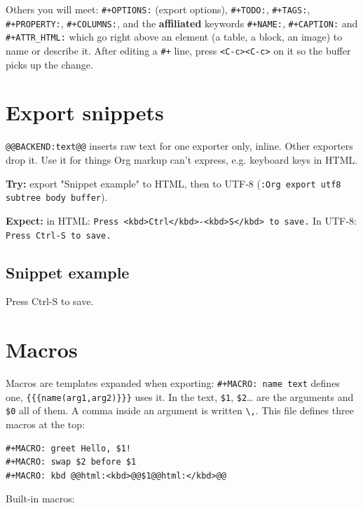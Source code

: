 Others you will meet: \texttt{\#+OPTIONS:} (export options), \texttt{\#+TODO:},
\texttt{\#+TAGS:}, \texttt{\#+PROPERTY:}, \texttt{\#+COLUMNS:}, and the \textbf{affiliated} keywords
\texttt{\#+NAME:}, \texttt{\#+CAPTION:} and \texttt{\#+ATTR\_HTML:} which go right above an element
(a table, a block, an image) to name or describe it. After editing a \texttt{\#+}
line, press \texttt{<C-c><C-c>} on it so the buffer picks up the change.
\section{Export snippets}
\label{sec:orgde2857d}
\texttt{@@BACKEND:text@@} inserts raw text for one exporter only, inline. Other
exporters drop it. Use it for things Org markup can't express, e.g.
keyboard keys in HTML.

\textbf{Try:} export "Snippet example" to HTML, then to UTF-8
(\texttt{:Org export utf8 subtree body buffer}).

\textbf{Expect:} in HTML: \texttt{Press <kbd>Ctrl</kbd>-<kbd>S</kbd> to save.} In UTF-8:
\texttt{Press Ctrl-S to save.}
\subsection{Snippet example}
\label{sec:org8242909}
Press Ctrl-S to save.
\section{Macros}
\label{sec:orgb72b707}
Macros are templates expanded when exporting: \texttt{\#+MACRO: name text} defines
one, \texttt{\{\{\{name(arg1,arg2)\}\}\}} uses it. In the text, \texttt{\$1}, \texttt{\$2}\ldots{} are the
arguments and \texttt{\$0} all of them. A comma inside an argument is written
\texttt{\textbackslash{},}. This file defines three macros at the top:

\begin{verbatim}
#+MACRO: greet Hello, $1!
#+MACRO: swap $2 before $1
#+MACRO: kbd @@html:<kbd>@@$1@@html:</kbd>@@
\end{verbatim}

Built-in macros:

